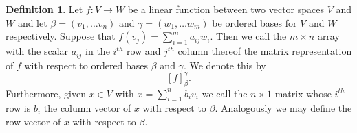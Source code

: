 \documentclass[oneside, 12pt]{book}
\theoremstyle{definition}
\newtheorem{defn}{Definition}[section]
\begin{document}
\begin{defn}
\label{defn_mat}
  Let $f: V \to W$ be a linear function between two vector spaces $V$ and $W$ and let $\beta=(v_{1}, \dots v_{n})$ and $\gamma=(w_{1}, \dots w_{m})$ be ordered bases for $V$ and $W$ respectively. Suppose that $f(v_{j})=\sum\limits_{i=1}^{m}a_{ij}w_{i}$. Then we call the $m \times n$ array with the scalar $a_{ij}$ in the $i^{th}$ row and $j^{th}$ column thereof the matrix representation of $f$ with respect to ordered bases $\beta$ and $\gamma$. We denote this by \[[f]_{\beta}^{\gamma} .\] Furthermore, given $x \in V$ with $x=\sum\limits_{i=1}^{n}b_{i}v_{i}$ we call the $n \times 1$ matrix whose $i^{th}$ row is $b_{i}$ the column vector of $x$ with respect to $\beta$. Analogously we may define the row vector of $x$ with respect to $\beta$.
\end{defn}
\end{document}

